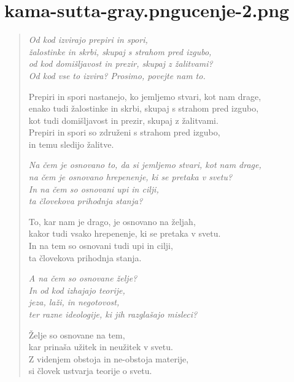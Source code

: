 
\chapter[Kalahavivāda Sutta]{{kama-sutta-gray.png}{ucenje-2.png}}


\begin{verse}


\emph{Od kod izvirajo prepiri in spori,\\
žalostinke in skrbi, skupaj s strahom pred izgubo,\\
od kod domišljavost in prezir, skupaj z žalitvami?\\
Od kod vse to izvira? Prosimo, povejte nam to.}

Prepiri in spori nastanejo, ko jemljemo stvari, kot nam drage,\\
enako tudi žalostinke in skrbi, skupaj s strahom pred izgubo,\\
kot tudi domišljavost in prezir, skupaj z žalitvami.\\
Prepiri in spori so združeni s strahom pred izgubo,\\
in temu sledijo žalitve.

\emph{Na čem je osnovano to, da si jemljemo stvari, kot nam drage,}\\
\emph{na čem je osnovano hrepenenje, ki se pretaka v svetu?}\\
\emph{In na čem so osnovani upi in cilji,}\\
\emph{ta človekova prihodnja stanja?}

To, kar nam je drago, je osnovano na željah,\\
kakor tudi vsako hrepenenje, ki se pretaka v svetu.\\
In na tem so osnovani tudi upi in cilji,\\
ta človekova prihodnja stanja.

\emph{A na čem so osnovane želje?}\\
\emph{In od kod izhajajo teorije,}\\
\emph{jeza, laži, in negotovost,}\\
\emph{ter razne ideologije, ki jih razglašajo misleci?}

Želje so osnovane na tem,\\
kar prinaša užitek in neužitek v svetu.\\
Z videnjem obstoja in ne-obstoja materije,\\
si človek ustvarja teorije o svetu.


\end{verse}
